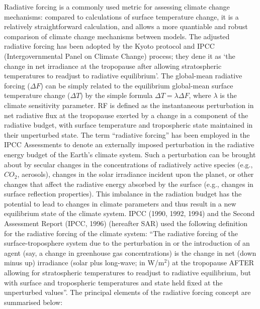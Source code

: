 Radiative forcing is a commonly used metric for assessing climate change mechanisms: compared to calculations of surface temperature change, it is a relatively straightforward calculation, and allows a more quantiable and robust comparison of climate change mechanisms between models. The adjusted radiative forcing has been adopted by the Kyoto protocol and IPCC (Intergovernmental Panel on Climate Change) process; they dene it as ‘the change in net irradiance at the tropopause after allowing stratospheric temperatures to readjust to radiative equilibrium’. The global-mean radiative forcing ($\Delta F$) can be simply related to the equilibrium global-mean surface temperature change ($\Delta T$) by the simple formula $\Delta T=\lambda\Delta F$, where $\lambda$ is the climate sensitivity parameter. RF is defined as the instantaneous perturbation in net radiative flux at the tropopause exerted by a change in a component of the radiative budget,
with surface temperature and tropospheric state maintained in their
unperturbed state. The term “radiative forcing” has been employed in the IPCC Assessments to denote an externally imposed perturbation in the radiative energy budget of the Earth’s climate system.
Such a perturbation can be brought about by secular changes in the
concentrations of radiatively active species (e.g., $CO_2$, aerosols), changes in the solar irradiance incident upon the planet, or other changes that affect the radiative energy absorbed by the surface (e.g., changes in surface reflection properties).
This imbalance in the radiation budget has the potential to lead to changes in climate parameters and thus result in a new equilibrium state of the climate system. IPCC (1990, 1992, 1994) and the Second Assessment Report (IPCC, 1996)
(hereafter SAR) used the following definition for the radiative forcing of the climate system:
“The radiative forcing of the surface-troposphere system due to the
perturbation in or the introduction of an agent (say, a change in greenhouse gas concentrations) is the change in net (down minus up) irradiance (solar plus long-wave; in W/m$^2$) at the tropopause AFTER allowing for stratospheric temperatures to readjust to radiative equilibrium, but with surface and tropospheric temperatures and state held fixed at the unperturbed values”.
The principal elements of the radiative forcing concept are summarised below:
